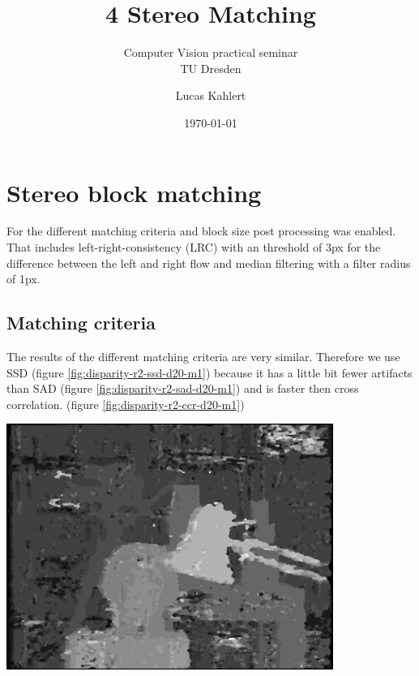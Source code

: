 \documentclass[a4paper]{scrartcl}
\title{4 Stereo Matching}
\subtitle{Computer Vision practical seminar \\ TU Dresden}
\author{Lucas Kahlert}
\date{\today}
\begin{document}
\maketitle

\section{Stereo block matching}

For the different matching criteria and block size post processing was
enabled. That includes left-right-consistency (LRC) with an threshold of 3px
for the difference between the left and right flow and median filtering with a
filter radius of 1px.



\subsection{Matching criteria}

The results of the different matching criteria are very similar. Therefore we
use SSD (figure \ref{fig:disparity-r2-ssd-d20-m1}) because it has a little bit fewer artifacts than SAD (figure \ref{fig:disparity-r2-sad-d20-m1}) and is faster
then cross correlation. (figure \ref{fig:disparity-r2-ccr-d20-m1})

\vspace{1cm}
\begin{minipage}{0.8\textwidth}
  \centering
  \includegraphics[width=0.8\textwidth]{disparity-r1-ssd-d20-m1.png}
  \label{fig:disparity-r2-ssd-d20-m1}
\end{minipage}
\end{document}
